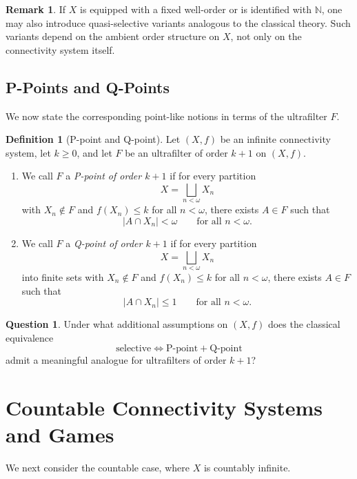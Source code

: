 \documentclass[10pt]{book}
\theoremstyle{definition}
\newtheorem{remark}[theorem]{Remark}
\newtheorem{definition}[theorem]{Definition}
\newtheorem{question}[theorem]{Question}
\begin{document}
\begin{remark}
If \(X\) is equipped with a fixed well-order or is identified with \(\mathbb{N}\), one may also introduce quasi-selective variants analogous to the classical theory.
Such variants depend on the ambient order structure on \(X\), not only on the connectivity system itself.
\end{remark}

\subsection{P-Points and Q-Points}
We now state the corresponding point-like notions in terms of the ultrafilter \(F\).

\begin{definition}[P-point and Q-point]
\label{def:pq_points_connectivity}
Let \((X,f)\) be an infinite connectivity system, let \(k\geq 0\), and let \(F\) be an ultrafilter of order \(k+1\) on \((X,f)\).

\begin{enumerate}
    \item We call \(F\) a \emph{P-point of order \(k+1\)} if for every partition
    \[
    X=\bigsqcup_{n<\omega} X_n
    \]
    with \(X_n\notin F\) and \(f(X_n)\leq k\) for all \(n<\omega\), there exists \(A\in F\) such that
    \[
    |A\cap X_n|<\omega
    \qquad\text{for all } n<\omega.
    \]

    \item We call \(F\) a \emph{Q-point of order \(k+1\)} if for every partition
    \[
    X=\bigsqcup_{n<\omega} X_n
    \]
    into finite sets with \(X_n\notin F\) and \(f(X_n)\leq k\) for all \(n<\omega\), there exists \(A\in F\) such that
    \[
    |A\cap X_n|\leq 1
    \qquad\text{for all } n<\omega.
    \]
\end{enumerate}
\end{definition}

\begin{question}
Under what additional assumptions on \((X,f)\) does the classical equivalence
\[
\text{selective} \Longleftrightarrow \text{P-point}+\text{Q-point}
\]
admit a meaningful analogue for ultrafilters of order \(k+1\)?
\end{question}

\section{Countable Connectivity Systems and Games}

We next consider the countable case, where \(X\) is countably infinite.
\end{document}
